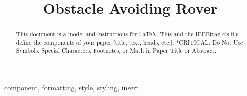 \title{Obstacle Avoiding Rover}

\author{
}

\maketitle

\begin{abstract}
This document is a model and instructions for \LaTeX.
This and the IEEEtran.cls file define the components of your paper [title, text, heads, etc.]. *CRITICAL: Do Not Use Symbols, Special Characters, Footnotes, 
or Math in Paper Title or Abstract.
\end{abstract}

\begin{IEEEkeywords}
component, formatting, style, styling, insert
\end{IEEEkeywords}